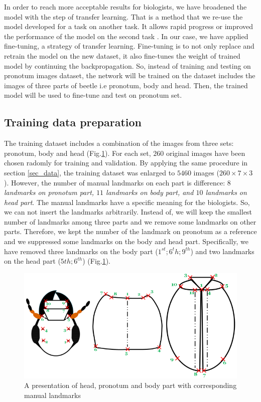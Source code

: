 \documentclass[10pt]{article}
\begin{document}
In order to reach more acceptable results for biologists, we have
broadened the model with the step of transfer learning. That is a
method that we re-use the model developed for a task on another
task. It allows rapid progress or improved the performance of the
model on the second task \cite{torrey2009transfer}. In our case, we
have applied fine-tuning, a strategy of transfer learning. Fine-tuning
is to not only replace and retrain the model on the new dataset, it
also fine-tunes the weight of trained model by continuing the
backpropagation. So, instead of training and testing on pronotum
images dataset, the network will be trained on the dataset includes
the images of three parts of beetle i.e pronotum, body and head. Then,
the trained model will be used to fine-tune and test on pronotum set.


\subsection{Training data preparation}
The training dataset includes a combination of the images from three
sets: pronotum, body and head (Fig.\ref{figshape3parts}). For each
set, $260$ original images have been chosen radomly for training and
validation. By applying the same procedure in section \ref{sec_data},
the training dataset was enlarged to $5460$ images ($260 \times 7
\times 3$). However, the number of manual landmarks on each part is
difference: \textit{$8$ landmarks on pronotum part, $11$ landmarks on
  body part, and $10$ landmarks on head part}. The manual landmarks
have a specific meaning for the biologists. So, we can not insert the
landmarks arbitrarily. Instead of, we will keep the smallest number of
landmarks among three parts and we remove some landmarks on other
parts. Therefore, we kept the number of the landmark on pronotum as a
reference and we suppressed some landmarks on the body and head
part. Specifically, we have removed three landmarks on the body part
($1^{st}; 6^{t}h; 9^{th}$) and two landmarks on the head part ($5{th};
6^{th}$) (Fig.\ref{figshape3parts}).


\begin{figure}[htbp]

        \centering
        \includegraphics[scale=0.25]{images/merge}
 
 
    \caption{\small{A presentation of head, pronotum and body part with corresponding manual landmarks}} 
    \label{figshape3parts}
\end{figure}
\end{document}
